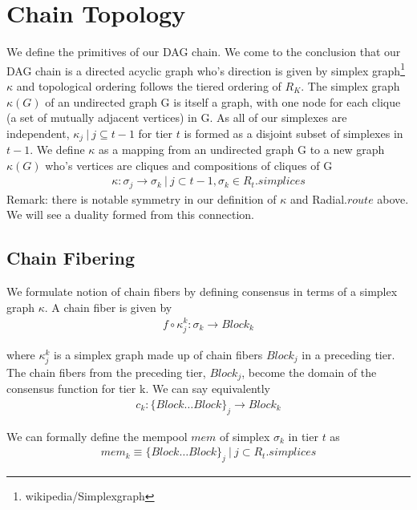 \documentclass{article}
\begin{document}
\section{Chain Topology}
We define the primitives of our DAG chain. We come to the conclusion that our DAG chain is a directed acyclic graph who's direction is given by simplex graph\footnote{wikipedia/Simplexgraph} $\kappa$ and topological ordering follows the tiered ordering of $R_K$. The simplex graph $\kappa(G)$ of an undirected graph G is itself a graph, with one node for each clique (a set of mutually adjacent vertices) in G. As all of our simplexes are independent, $\kappa_j \ | \ j \subseteq t-1$ for tier $t$ is formed as a disjoint subset of simplexes in $t-1$. We define $\kappa$ as a mapping from an undirected graph G to a new graph $\kappa(G)$ who's vertices are cliques and compositions of cliques of G
\begin{equation} \label{eq1}
\begin{split}
\kappa: \sigma_j \rightarrow \sigma_k \ | \ j \subset t-1, \sigma_k \in R_t.simplices
\end{split}
\end{equation}
Remark: there is notable symmetry in our definition of $\kappa$ and Radial.$route$ above. We will see a duality formed from this connection.

\subsection{Chain Fibering}
We formulate notion of chain fibers by defining consensus in terms of a simplex graph $\kappa$. A chain fiber is given by 
\begin{equation} \label{eq1}
\begin{split}
f \circ \kappa_j^{k}: \sigma_k  \rightarrow Block_k
\end{split}
\end{equation}

where $\kappa_j^{k}$ is a simplex graph made up of chain fibers $Block_j$ in a preceding tier. The chain fibers from the preceding tier, $Block_j$, become the domain of the consensus function for tier k. We can say equivalently
\begin{equation} \label{eq1}
\begin{split}
c_k: \{Block \dots Block\}_j \rightarrow Block_k
\end{split}
\end{equation}

We can formally define the mempool $mem$ of simplex $\sigma_k$ in tier $t$ as 
\begin{equation} \label{eq1}
\begin{split}
mem_k \equiv \{Block \dots Block\}_j \ | \ j \subset R_t.simplices
\end{split}
\end{equation}
\end{document}
